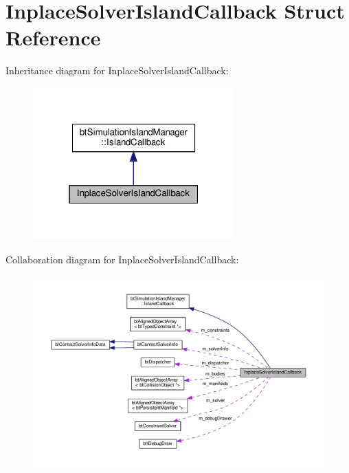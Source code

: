 \hypertarget{structInplaceSolverIslandCallback}{}\section{Inplace\+Solver\+Island\+Callback Struct Reference}
\label{structInplaceSolverIslandCallback}


Inheritance diagram for Inplace\+Solver\+Island\+Callback\+:
\nopagebreak
\begin{figure}[H]
\begin{center}
\leavevmode
\includegraphics[width=220pt]{structInplaceSolverIslandCallback__inherit__graph}
\end{center}
\end{figure}


Collaboration diagram for Inplace\+Solver\+Island\+Callback\+:
\nopagebreak
\begin{figure}[H]
\begin{center}
\leavevmode
\includegraphics[width=350pt]{structInplaceSolverIslandCallback__coll__graph}
\end{center}
\end{figure}
